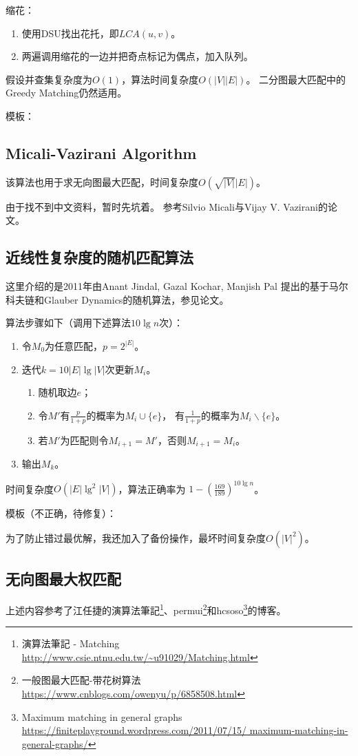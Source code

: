 缩花：
\begin{enumerate}
    \item 使用DSU找出花托，即$LCA(u,v)$。
    \item 两遍调用缩花的一边并把奇点标记为偶点，加入队列。
\end{enumerate}

假设并查集复杂度为$O(1)$，算法时间复杂度$O(|V||E|)$。
二分图最大匹配中的Greedy Matching仍然适用。

模板：


\subsection{Micali-Vazirani Algorithm}
该算法也用于求无向图最大匹配，时间复杂度$O(\sqrt{|V|}|E|)$。

由于找不到中文资料，暂时先坑着。
参考Silvio Micali与Vijay V. Vazirani的论文\cite{MMG}。
\subsection{近线性复杂度的随机匹配算法}
这里介绍的是2011年由Anant Jindal, Gazal Kochar, Manjish Pal
提出的基于马尔科夫链和Glauber Dynamics的随机算法，参见论文\cite{AGM}。

算法步骤如下（调用下述算法$10\lg n$次）：
\begin{enumerate}
    \item 令$M_0$为任意匹配，$p=2^{|E|}$。
    \item 迭代$k=10|E|\lg|V|$次更新$M_i$。
    \begin{enumerate}
        \item 随机取边$e$；
        \item 令$M'$有$\frac{p}{1+p}$的概率为$M_i\cup \{e\}$，
        有$\frac{1}{1+p}$的概率为$M_i \backslash \{e\}$。
        \item 若$M'$为匹配则令$M_{i+1}=M'$，否则$M_{i+1}=M_i$。
    \end{enumerate}
    \item 输出$M_k$。
\end{enumerate}

时间复杂度$O(|E|\lg^2|V|)$，算法正确率为
$1-\left(\frac{169}{189}\right)^{10\lg n}$。

模板（不正确，待修复）：

为了防止错过最优解，我还加入了备份操作，最坏时间复杂度$O(|V|^2)$。



\subsection{无向图最大权匹配}

上述内容参考了江任捷的演算法筆記\footnote{
    演算法筆記 - Matching
    \url{http://www.csie.ntnu.edu.tw/\~u91029/Matching.html}
}、permui\footnote{
    一般图最大匹配-带花树算法
    \url{https://www.cnblogs.com/owenyu/p/6858508.html}
}和hcsoso\footnote{
    Maximum matching in general graphs
    \url{https://finiteplayground.wordpress.com/2011/07/15/
    maximum-matching-in-general-graphs/}
}的博客。
